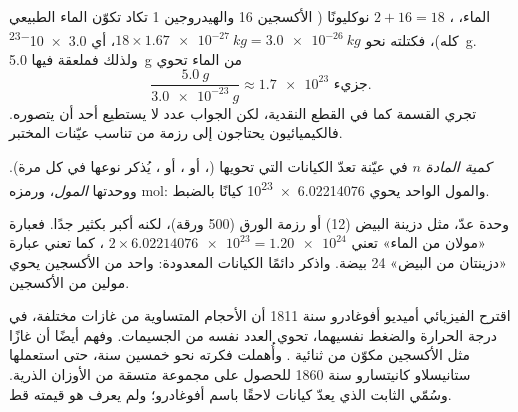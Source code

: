 \begin{example}\label{ex:g10:the-mole:spoon}
 الماء، ، $2 + 16 = 18$ نوكليونًا ( الأكسجين 16
والهيدروجين 1 تكاد تكوّن الماء الطبيعي كله)، فكتلته نحو
$18 \times \qty{1.67e-27}{kg} = \qty{3.0e-26}{kg}$، أي
\qty{3.0e-23}{g}. ولذلك فملعقة فيها \qty{5.0}{g} من الماء تحوي
\[
  \frac{\qty{5.0}{g}}{\qty{3.0e-23}{g}} \approx \num{1.7e23}
  \text{ جزيء.}
\]
تجري القسمة كما في القطع النقدية، لكن الجواب عدد لا يستطيع أحد أن يتصوره.
فالكيميائيون يحتاجون إلى رزمة من  تناسب عيّنات
المختبر.
\end{example}

\begin{definition}\label{def:g10:the-mole:amount}
\emph{كمية المادة} $n$ في عيّنة تعدّ الكيانات التي تحويها
(، أو ، أو ، يُذكر نوعها في كل مرة). ووحدتها
\emph{المول}، ورمزه \si{mol}: والمول الواحد يحوي
\num{6.02214076e23} كيانًا بالضبط.
\end{definition}

\begin{remark}\label{rem:g10:the-mole:dozen}
 وحدة عدّ، مثل دزينة البيض (12) أو رزمة الورق (500 ورقة)، لكنه أكبر
بكثير جدًا. فعبارة «مولان من  الماء» تعني
$2 \times \num{6.02214076e23} = \num{1.20e24}$ ، كما تعني عبارة
«دزينتان من البيض» 24 بيضة. واذكر دائمًا الكيانات المعدودة:  واحد من
\emph{} الأكسجين  يحوي مولين من
\emph{} الأكسجين.
\end{remark}

\begin{history}
اقترح الفيزيائي أميديو أفوغادرو سنة 1811 أن الأحجام المتساوية من غازات مختلفة،
في درجة الحرارة والضغط نفسيهما، تحوي العدد نفسه من الجسيمات. وفهم أيضًا أن
غازًا مثل الأكسجين مكوّن من  ثنائية . وأُهملت فكرته نحو خمسين سنة،
حتى استعملها ستانيسلاو كانيتسارو سنة 1860 للحصول على مجموعة متسقة من الأوزان
الذرية. وسُمّي الثابت الذي يعدّ كيانات  لاحقًا باسم أفوغادرو؛ ولم يعرف
هو قيمته قط.
\end{history}

